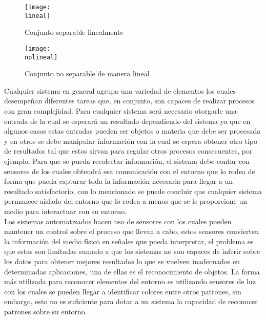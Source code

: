 \documentclass[a4paper, 12pt]{article}
\newcommand{\lineal}{img/lineal.png}
\newcommand{\nolineal}{img/nol.png}
\begin{document}
    \begin{figure}[H] 
        \centering 
        \texttt{[image: \\lineal]} 
        \caption{Conjunto separable linealmente} 
        \label{fig:lin} 
    \end{figure} 

    \begin{figure}[H] 
        \centering 
        \texttt{[image: \\nolineal]} 
        \caption{Conjunto no separable de manera lineal} 
        \label{fig:nolin} 
    \end{figure} 

    Cualquier sistema en general agrupa una variedad de elementos los cuales desempeñan diferentes tareas que, en conjunto, son capaces de realizar procesos con gran complejidad. Para cualquier sistema será necesario otorgarle una entrada de la cual se esperará un resultado dependiendo del sistema ya que en algunos casos estas entradas pueden ser objetos o materia que debe ser procesada y en otros se debe manipular información con la cual se espera obtener otro tipo de resultados tal que estos sirvan para regular otros procesos consecuentes, por ejemplo. Para que se pueda recolectar información, el sistema debe contar con sensores de los cuales obtendrá esa comunicación con el entorno que lo rodea de forma que pueda capturar toda la información necesaria para llegar a un resultado satisfactorio, con lo mencionado se puede concluir que cualquier sistema permanece aislado del entorno que lo rodea a menos que se le proporcione un medio para interactuar con su entorno.\\ 
    Los sistemas automatizados hacen uso de sensores con los cuales pueden mantener un control sobre el proceso que llevan a cabo, estos sensores convierten la información del medio físico en señales que pueda interpretar, el problema es que estas son limitadas sumado a que los sistemas no son capaces de inferir sobre los datos para obtener mejores resultados lo que se vuelven inadecuados en determinadas aplicaciones, una de ellas es el reconocimiento de objetos. La forma más utilizada para reconocer elementos del entorno es utilizando sensores de luz con los cuales se pueden llegar a identificar colores entre otros patrones, sin embargo, esto no es suficiente para dotar a un sistema la capacidad de reconocer patrones sobre su entorno. 
\end{document}
